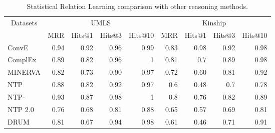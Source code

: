 \documentclass{article}
\begin{document}
\begin{table}[!h]
\centering
\caption{Statistical Relation Learning comparison with other reasoning methods.}
\begin{tabular}{lrrrrrrrr} 
\toprule
\multicolumn{1}{c}{\multirow{2}{*}{Datasets}} & \multicolumn{4}{c}{UMLS}                                                                                        & \multicolumn{4}{c}{Kinship}                                                                                      \\
\multicolumn{1}{c}{}                          & \multicolumn{1}{c}{MRR} & \multicolumn{1}{c}{Hits@1} & \multicolumn{1}{c}{Hits@3} & \multicolumn{1}{c}{Hits@10} & \multicolumn{1}{c}{MRR} & \multicolumn{1}{c}{Hits@1} & \multicolumn{1}{c}{Hits@3} & \multicolumn{1}{c}{Hits@10}  \\ 
\hline
ConvE                                         & 0.94                    & 0.92                       & 0.96                       & 0.99                        & 0.83                    & 0.98                       & 0.92                       & 0.98                         \\
ComplEx                                       & 0.89                    & 0.82                       & 0.96                       & 1                           & 0.81                    & 0.7                        & 0.89                       & 0.98                         \\
MINERVA                                       & 0.82                    & 0.73                       &  0.90                       & 0.97                        &  0.72                    &  0.60                       & 0.81                       &  0.92                         \\
\hline
NTP                                           & 0.88                    & 0.82                       & 0.92                       & 0.97                        & 0.6                     & 0.48                       & 0.7                        & 0.78                         \\
NTP-                    & 0.93                    & 0.87                       & 0.98                       & 1                           & 0.8                     & 0.76                       & 0.82                       & 0.89                         \\
NTP 2.0                                       & 0.76                    & 0.68                       & 0.81                       & 0.88                        & 0.65                    & 0.57                       & 0.69                       & 0.81                         \\
DRUM                                          & 0.81                    & 0.67                       & 0.94                       & 0.98                        & 0.61                    & 0.46                       & 0.71                       & 0.91                         \\
\bottomrule
\end{tabular}
\end{table}
\end{document}
